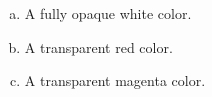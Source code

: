 \begin{Answer}[ref={tga-16-bit}]

  \begin{enumerate}[(a)]
  \item A fully opaque white color.
  \item A transparent red color.
  \item A transparent magenta color.
  \end{enumerate}

\end{Answer}


